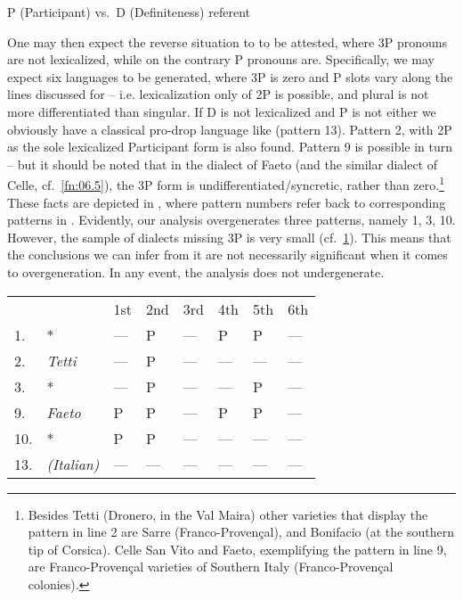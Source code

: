 \documentclass[output=paper]{langsci/langscibook}
\begin{document}
\ea%
    \label{ex:06.23}
    P (Participant) vs.\ D (Definiteness) referent
\z

One may then expect the reverse situation to  to be attested,
where 3P pronouns are not lexicalized, while on the contrary P pronouns are.
Specifically, we may expect six languages to be generated, where 3P is zero and
P slots vary along the lines discussed for  – i.e.
lexicalization only of 2P is possible, and plural is not more differentiated
than singular. If D is not lexicalized and P is not either we obviously have a
classical pro-drop language like  (pattern 13). Pattern 2, with 2P as
the sole lexicalized Participant form is also found. Pattern 9 is possible in
turn – but it should be noted that in the dialect of Faeto (and the similar
dialect of Celle, cf.\ \cref{fn:06.5}), the 3P form is
undifferentiated/syncretic, rather than zero.\footnote{Besides Tetti (Dronero,
    in the  Val Maira) other varieties that display the pattern in line
    2 are Sarre (Franco-Provençal), and Bonifacio (at the southern tip of
    Corsica). Celle San Vito and Faeto, exemplifying the pattern in line 9, are
Franco-Provençal varieties  of Southern Italy (Franco-Provençal colonies).\label{fn:06.7}} These
facts are depicted in , where pattern numbers refer
back to corresponding patterns in . Evidently, our analysis
overgenerates three patterns, namely 1, 3, 10. However, the sample of dialects
missing 3P is very small (cf.\ \cref{fn:06.7}).  This means that the
conclusions we can infer from it are not necessarily significant when it comes
to overgeneration. In any event, the analysis does not undergenerate.

\ea\label{ex:06.24}
\begin{tabular}[t]{llllllll}
    &                  & 1st & 2nd & 3rd & 4th & 5th & 6th \\
1.  & *                & --- & P   & --- & P   & P   & --- \\
2.  & \emph{Tetti}     & --- & P   & --- & --- & --- & --- \\
3.  & *                & --- & P   & --- & --- & P   & --- \\
9.  & \emph{Faeto}     & P   & P   & --- & P   & P   & --- \\
10. & *                & P   & P   & --- & --- & --- & --- \\
13. & \emph{(Italian)} & --- & --- & --- & --- & --- & --- \\
\end{tabular}
\z
\end{document}
